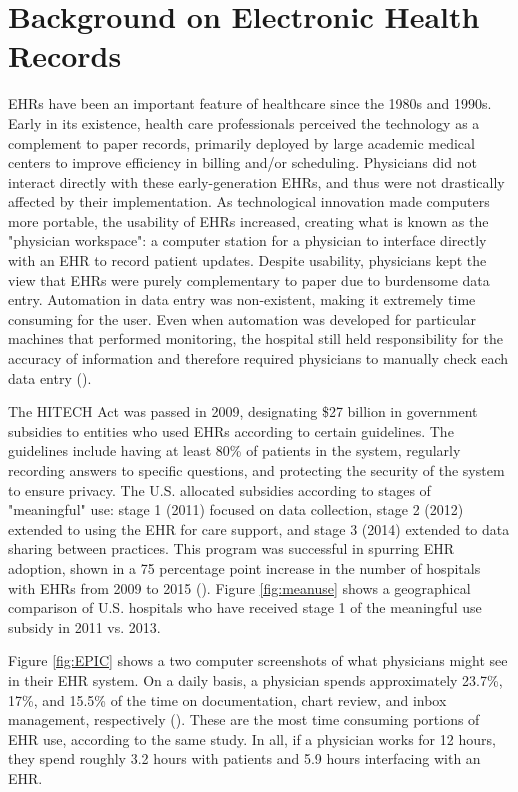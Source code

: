 \documentclass[11pt]{article}
\begin{document}
\section{Background on Electronic Health Records}

EHRs have been an important feature of healthcare since the 1980s and 1990s. Early in its existence, health care professionals perceived the technology as a complement to paper records, primarily deployed by large academic medical centers to improve efficiency in billing and/or scheduling. Physicians did not interact directly with these early-generation EHRs, and thus were not drastically affected by their implementation. As technological innovation made computers more portable, the usability of EHRs increased, creating what is known as the "physician workspace": a computer station for a physician to interface directly with an EHR to record patient updates. Despite usability, physicians kept the view that EHRs were purely complementary to paper due to burdensome data entry. Automation in data entry was non-existent, making it extremely time consuming for the user. Even when automation was developed for particular machines that performed monitoring, the hospital still held responsibility for the accuracy of information and therefore required physicians to manually check each data entry (\cite{evans2016electronic}). 

The HITECH Act was passed in 2009, designating \$27 billion in government subsidies to entities who used EHRs according to certain guidelines. The guidelines include having at least 80\% of patients in the system, regularly recording answers to specific questions, and protecting the security of the system to ensure privacy. The U.S. allocated subsidies according to stages of "meaningful" use: stage 1 (2011) focused on data collection, stage 2 (2012) extended to using the EHR for care support, and stage 3 (2014) extended to data sharing between practices. This program was successful in  spurring EHR adoption, shown in a 75 percentage point increase in the number of hospitals with EHRs from 2009 to 2015 (\cite{stats}). Figure \ref{fig:meanuse} shows a geographical comparison of U.S. hospitals who have received stage 1 of the meaningful use subsidy in 2011 vs. 2013. 

Figure \ref{fig:EPIC} shows a two computer screenshots of what physicians might see in their EHR system. On a daily basis, a physician spends approximately 23.7\%, 17\%, and 15.5\% of the time on documentation, chart review, and inbox management, respectively (\cite{arndt2017tethered}). These are the most time consuming portions of EHR use, according to the same study. In all, if a physician works for 12 hours, they spend roughly 3.2 hours with patients and 5.9 hours interfacing with an EHR. 
\end{document}
